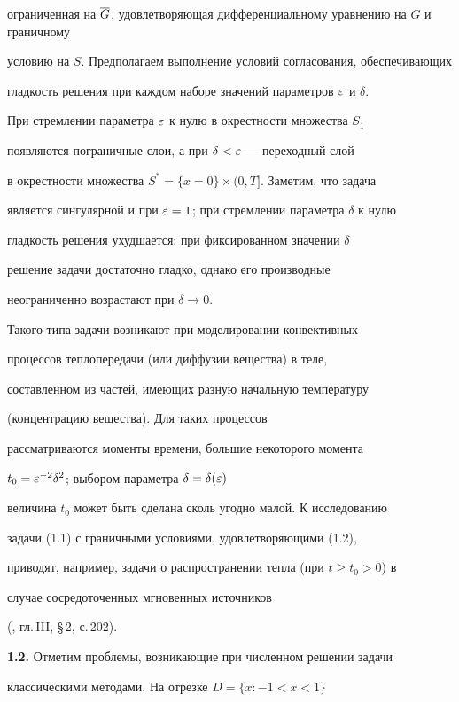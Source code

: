 ограниченная на $\overline{G}$, удовлетворяющая дифференциальному уравнению на $G$ и граничному


условию на $S$. Предполагаем выполнение условий согласования, обеспечивающих


гладкость решения при каждом наборе значений параметров $\varepsilon$ и $\delta$.





При стремлении параметра $\varepsilon$ к нулю в окрестности множества $S_1$


появляются пограничные слои, а при $\delta<\varepsilon$ --- переходный слой


в окрестности множества $S^*=\{x=0\}\times(0,T]$. Заметим, что задача 


является сингулярной и при $\varepsilon=1$; при стремлении параметра $\delta$ к нулю 


гладкость решения ухудшается: при фиксированном значении $\delta$ 


решение задачи достаточно гладко, однако его производные


неограниченно возрастают при $\delta\to 0$.





Такого типа задачи возникают при моделировании конвективных 


процессов теплопередачи (или диффузии вещества) в теле, 


составленном из частей, имеющих разную начальную температуру 


(концентрацию вещества). Для таких процессов


рассматриваются моменты времени, большие некоторого момента


$t_0=\varepsilon^{-2}\delta^2$; выбором параметра $\delta=\delta(\varepsilon)$


величина $t_0$ может быть сделана сколь угодно малой. К исследованию


задачи (1.1) с граничными условиями, удовлетворяющими (1.2), 


приводят, например, задачи о распространении тепла (при $t\ge t_0>0$) в


случае сосредоточенных мгновенных источников


(\cite{Ti}, гл.\,III, \S\,2, с.\,202).





{\bf 1.2.} Отметим проблемы, возникающие при численном решении задачи 


классическими методами. На отрезке $D=\{x:-1<x<1\}$


